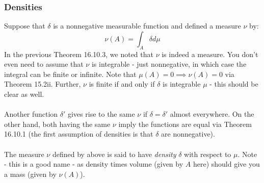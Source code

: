 \documentclass[12pt,a4paper]{article}
\newcommand{\1}[1]{\mathbbm{1}\left\{ #1 \right\}}
\begin{document}
\subsubsection{Densities}
Suppose that $\delta$ is a nonnegative measurable function and defined a measure $\nu$ by:
$$
	\nu(A) = \int_A \delta d\mu
$$
In the previous Theorem 16.10.3, we noted that $\nu$ is indeed a measure. You don't even need to assume that $\nu$ is integrable - just nonnegative, in which case the integral can be finite or infinite. Note that $\mu(A) = 0 \implies \nu(A) = 0$ via Theorem 15.2ii. Further, $\nu$ is finite if and only if $\delta$ is integrable $\mu$ - this should be clear as well.
\\\\
Another function $\delta'$ gives rise to the same $\nu$ if $\delta = \delta'$ almost everywhere. On the other hand, both having the same $\nu$ imply the functions are equal via Theorem 16.10.1 (the first assumption of densities is that $\delta$ are nonnegative).
\\\\
The measure $\nu$ defined by above is said to have \textit{density} $\delta$ with respect to $\mu$. Note - this is a good name - as density times volume (given by $A$ here) should give you a mass (given by $\nu(A)$). 
\end{document}
